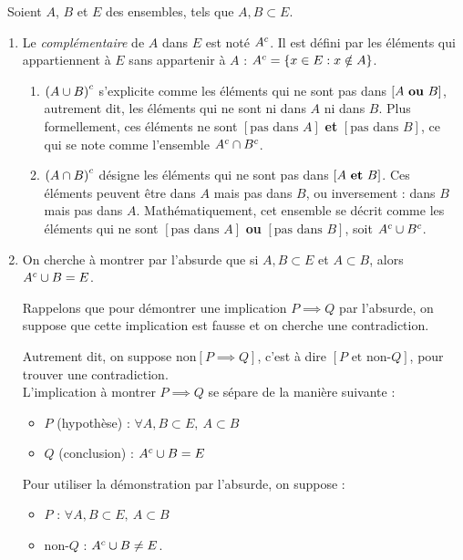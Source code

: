 \begin{exercice}\ 
Soient $A$, $B$ et $E$ des ensembles, tels que $A,B \subset E$.
    \begin{enumerate}
        \item
        Le \textit{complémentaire} de $A$ dans $E$ est noté ${A}^c$. Il est défini par les éléments qui appartiennent à $E$ sans appartenir à $A$ : ${A}^c = \left\{x \in E : x \notin A\right\}$.

        \begin{enumerate}

            \item ${(A \cup B)}^c$ s'explicite comme \guillemotleft les éléments qui ne sont pas dans $\left[A \text{ \textbf{ou} } B\right]$\guillemotright, autrement dit, les éléments qui ne sont ni dans $A$ ni dans $B$. Plus formellement, ces éléments ne sont $\left[\text{pas dans } A\right]$ \textbf{et} $\left[\text{pas dans } B\right]$, ce qui se note comme l'ensemble ${A}^c \cap {B}^c$.

            \item ${(A \cap B)}^c$ désigne les éléments qui ne sont pas dans $\left[A \text{ \textbf{et} } B\right]$. Ces éléments peuvent être dans $A$ mais pas dans $B$, ou inversement : dans $B$ mais pas dans $A$. Mathématiquement, cet ensemble se décrit comme \guillemotleft les éléments qui ne sont $\left[\text{pas dans }A\right]$ \textbf{ou} $\left[\text{pas dans }B\right]$\guillemotright, soit ${A}^c \cup {B}^c$.
        \end{enumerate}

        \item On cherche à montrer par l'absurde que si $A,B \subset E$ et $A \subset B$, alors ${A}^c \cup B = E$.
        
        Rappelons que pour démontrer une implication $P \implies Q$ par l'absurde, on suppose que cette implication est fausse et on cherche une contradiction.
        
        Autrement dit, on suppose $\text{non}\left[P \implies Q\right]$, c'est à dire $\left[P \text{ et non-}Q\right]$, pour trouver une contradiction. \\
        

        L'implication à montrer $P \implies Q$ se sépare de la manière suivante :
        \begin{itemize}
            \item $P$ (hypothèse) : $\forall A, B \subset E,\ A \subset B$
            \item $Q$ (conclusion) : ${A}^c \cup B = E$
        \end{itemize}
        Pour utiliser la démonstration par l'absurde, on suppose :
        \begin{itemize}
            \item $P$ : $\forall A, B \subset E,\ A \subset B$
            \item $\text{non-}Q$ : ${A}^c \cup B \neq E$.\\
        \end{itemize}


\end{enumerate}
\end{exercice}
